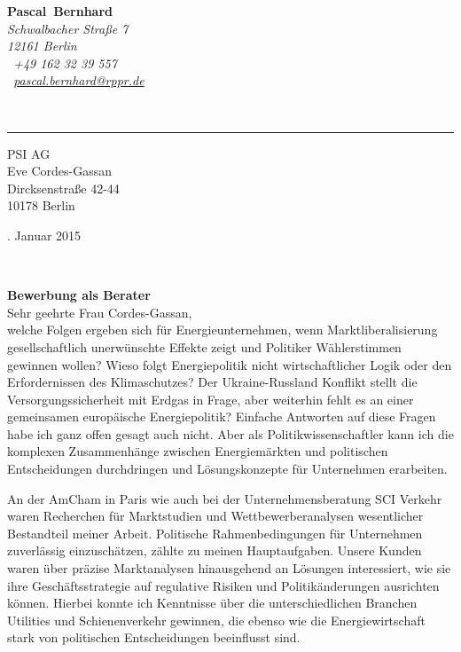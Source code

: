 \documentclass[11pt,a4paper]{article}
\def\firstname{Pascal}
\def\familyname{Bernhard}
\begin{document}
\sffamily   %
\hfill%
\begin{minipage}[t]{.6\textwidth}
	\raggedleft%
	{\bfseries {\color{firstnamecolor}\firstname}~{\color{familynamecolor}\familyname}}\\[.35ex]
	\small\itshape%
	Schwalbacher Straße 7\\
	12161 Berlin\\[.35ex]
	\Mobilefone~+49 162 32 39 557 \\
	\Letter~\href{mailto:pascal.bernhard@rppr.de}{pascal.bernhard@rppr.de}
\end{minipage}\\[0.5em]
%
{\color{firstnamecolor}\rule{\textwidth}{.25ex}}
%
\begin{minipage}[t]{.4\textwidth}
	\raggedright%
	\vspace*{1em}
	PSI AG \\
	Eve Cordes-Gassan\\[.35ex]
	\small%
	Dircksenstraße 42-44\\
	10178 Berlin
\end{minipage}
%
\hfill
%
\begin{minipage}[t]{.4\textwidth}
	. Januar 2015
\end{minipage}\\[1em]
\raggedright

{\bfseries \color{familynamecolor}Bewerbung als Berater}\\[1.5em]

Sehr geehrte Frau Cordes-Gassan,\\[1em]
%
welche Folgen ergeben sich für Energieunternehmen, wenn Marktliberalisierung gesellschaftlich unerwünschte Effekte zeigt und Politiker Wählerstimmen gewinnen wollen? Wieso folgt Energiepolitik nicht wirtschaftlicher Logik oder den Erfordernissen des Klimaschutzes? Der Ukraine-Russland Konflikt stellt die Versorgungssicherheit mit Erdgas in Frage, aber weiterhin fehlt es an einer gemeinsamen europäische Energiepolitik? Einfache Antworten auf diese Fragen habe ich ganz offen gesagt auch nicht. Aber als Politikwissenschaftler kann ich die komplexen Zusammenhänge zwischen Energiemärkten und politischen Entscheidungen durchdringen und Lösungskonzepte für Unternehmen erarbeiten.

An der AmCham in Paris wie auch bei der Unternehmensberatung SCI Verkehr waren Recherchen für Marktstudien und Wettbewerberanalysen wesentlicher Bestandteil meiner Arbeit. Politische Rahmenbedingungen für Unternehmen zuverlässig einzuschätzen, zählte zu meinen Hauptaufgaben. Unsere Kunden waren über präzise Marktanalysen hinausgehend an Lösungen interessiert, wie sie ihre Geschäftsstrategie auf regulative Risiken und Politikänderungen ausrichten können. Hierbei konnte ich Kenntnisse über die unterschiedlichen Branchen Utilities und Schienenverkehr gewinnen, die ebenso wie die Energiewirtschaft stark von politischen Entscheidungen beeinflusst sind. 
\end{document}
